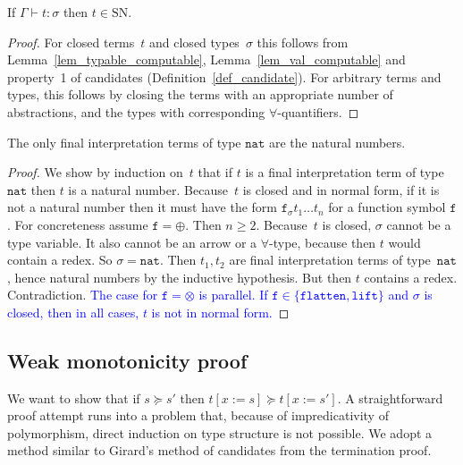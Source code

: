 \documentclass[a4paper,UKenglish,cleveref,autoref,numberwithinsect]{lipics-v2019}
\theoremstyle{definition}
\newcommand{\subst}[2]{#1:=#2}
\newcommand{\nat}{\mathtt{nat}}
\newcommand{\flatten}{\mathtt{flatten}}
\newcommand{\lift}{\mathtt{lift}}
\newcommand{\SN}{\mathrm{SN}}
\newcommand{\proves}{\vdash}
\newcommand{\CKchange}[1]{\textcolor{blue}{#1}}
\begin{document}
{ \renewcommand{\thetheorem}{\ref{thm_sn}}
\begin{theorem}
  If $\Gamma \proves t : \sigma$ then $t \in \SN$.
\end{theorem}
\addtocounter{theorem}{-1}}

\begin{proof}
  For closed terms~$t$ and closed types~$\sigma$ this follows from
  Lemma~\ref{lem_typable_computable}, Lemma~\ref{lem_val_computable}
  and property~1 of candidates (Definition~\ref{def_candidate}). For
  arbitrary terms and types, this follows by closing the terms with an
  appropriate number of abstractions, and the types with corresponding
  $\forall$-quantifiers.
\end{proof}

{ \renewcommand{\thelemma}{\ref{lem_final_nat}}
\begin{lemma}
  The only final interpretation terms of type $\nat$ are the natural
  numbers.
\end{lemma}
\addtocounter{theorem}{-1}}

\begin{proof}
  We show by induction on~$t$ that if $t$ is a final interpretation
  term of type~$\nat$ then $t$ is a natural number. Because~$t$ is
  closed and in normal form, if it is not a natural number then it
  must have the form $\mathtt{f}_\sigma t_1 \ldots t_n$ for a function
  symbol $\mathtt{f}$. For concreteness assume $\mathtt{f} =
  \oplus$. Then $n \ge 2$. Because~$t$ is closed, $\sigma$ cannot be a
  type variable. It also cannot be an arrow or a $\forall$-type,
  because then $t$ would contain a redex. So $\sigma=\nat$. Then
  $t_1,t_2$ are final interpretation terms of type~$\nat$, hence
  natural numbers by the inductive hypothesis. But then $t$ contains a
  redex. Contradiction.
  \CKchange{The case for $\mathtt{f} = \otimes$ is parallel.  If
  $\mathtt{f} \in \{\flatten,\lift\}$ and $\sigma$ is closed, then
  in all cases, $t$ is not in normal form.}
\end{proof}

\subsection{Weak monotonicity proof}\label{sec_weakly_monotone_proof}

We want to show that if $s \succeq s'$ then $t[\subst{x}{s}] \succeq
t[\subst{x}{s'}]$. A straightforward proof attempt runs into a problem
that, because of impredicativity of polymorphism, direct induction on
type structure is not possible. We adopt a method similar to Girard's
method of candidates from the termination proof.
\end{document}
